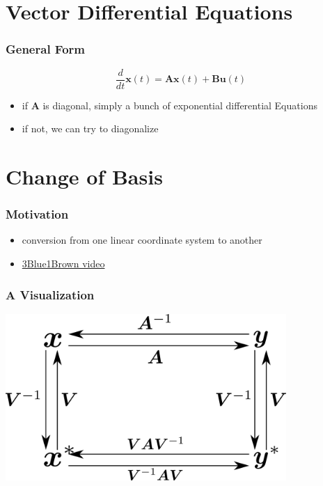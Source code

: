 \documentclass[aspectratio=169]{beamer}
\newcommand{\diff}[1]{\frac{d}{d #1}}
\begin{document}

\section{Vector Differential Equations}

\begin{frame}
    \frametitle{General Form}

    \begin{equation}
        \diff{t} \bm{x}(t) = \bm{Ax}(t) + \bm{Bu}(t)
    \end{equation}
    \begin{itemize}
        \item if \(\bm{A}\) is diagonal, simply a bunch of exponential differential Equations
        \item if not, we can try to diagonalize
    \end{itemize}
\end{frame}

\section{Change of Basis}

\begin{frame}
    \frametitle{Motivation}

    \begin{itemize}
        \item conversion from one linear coordinate system to another
        \item \href{https://youtu.be/P2LTAUO1TdA?list=PLZHQObOWTQDPD3MizzM2xVFitgF8hE_ab}{3Blue1Brown video}
    \end{itemize}
\end{frame}

\begin{frame}
    \frametitle{A Visualization}

    \begin{center}
        \includegraphics[width=0.8\textwidth]{change-of-basis.png}
    \end{center}
\end{frame}
\end{document}
